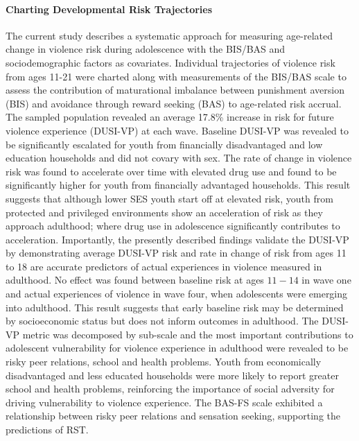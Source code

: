 \documentclass[utf8]{article}
\begin{document}
\paragraph{Charting Developmental Risk Trajectories} The current study describes a systematic approach for measuring age-related change in violence risk during adolescence with the BIS/BAS and sociodemographic factors as covariates. Individual trajectories of violence risk from ages 11-21 were charted along with measurements of the BIS/BAS scale to assess the contribution of maturational imbalance between punishment aversion (BIS) and avoidance through reward seeking (BAS) to age-related risk accrual. The sampled population revealed an average 17.8\% increase in risk for future violence experience (DUSI-VP) at each wave. Baseline DUSI-VP was revealed to be significantly escalated for youth from financially disadvantaged and low education households and did not covary with sex. The rate of change in violence risk was found to accelerate over time with elevated drug use and found to be significantly higher for youth from financially advantaged households. This result suggests that although lower SES youth start off at elevated risk, youth from protected and privileged environments show an acceleration of risk as they approach adulthood; where drug use in adolescence significantly contributes to acceleration. Importantly, the presently described findings validate the DUSI-VP by demonstrating average DUSI-VP risk and rate in change of risk from ages 11 to 18 are accurate predictors of actual experiences in violence measured in adulthood. No effect was found between baseline risk at ages $11-14$ in wave one and actual experiences of violence in wave four, when adolescents were emerging into adulthood. This result suggests that early baseline risk may be determined by socioeconomic status but does not inform outcomes in adulthood. The DUSI-VP metric was decomposed by sub-scale and the most important contributions to adolescent vulnerability for violence experience in adulthood were revealed to be risky peer relations, school and health problems. Youth from economically disadvantaged and less educated households were more likely to report greater school and health problems, reinforcing the importance of social adversity for driving vulnerability to violence experience. The BAS-FS scale exhibited a relationship between risky peer relations and sensation seeking, supporting the predictions of RST.  
\end{document}
